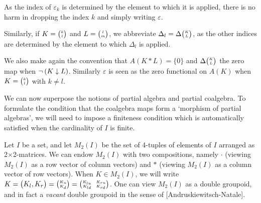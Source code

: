 \begin{Not}\label{NotCom} As the index of $\varepsilon_k$ is determined by the element to which it is applied, there is no harm in dropping the index $k$ and simply writing $\varepsilon$.

Similarly, if $K = {\tiny {\begin{pmatrix} k\\l\end{pmatrix}}}$ and $L = {\tiny {\begin{pmatrix} l\\m\end{pmatrix}}}$, we abbreviate $\Delta_l = \Delta{\tiny {\begin{pmatrix} K\\L\end{pmatrix}}}$, as the other indices are determined by the element to which $\Delta_l$ is applied.
\end{Not}

We also make again the convention that $A(K*L)=\{0\}$ and $\Delta{\tiny {\begin{pmatrix} K\\L\end{pmatrix}}}$ the zero map when $\neg\left(K\downarrow L\right)$. Similarly $\varepsilon$ is seen as the zero functional on $A(K)$ when $K={\tiny {\begin{pmatrix} k\\l\end{pmatrix}}}$ with $k\neq l$. 


We can now superpose the notions of partial algebra and partial coalgebra. To formulate the condition that the coalgebra maps form a `morphism of partial algebras', we will need to impose a finiteness condition which is automatically satisfied when the cardinality of $I$ is finite.

Let $I$ be a set, and let $M_2(I)$ be the set of 4-tuples of elements of $I$ arranged as 2$\times$2-matrices. We can endow $M_2(I)$ with two compositions, namely $\cdot$ (viewing $M_2(I)$ as a row vector of column vectors) and $*$ (viewing $M_2(I)$ as a column vector of row vectors). When $K\in M_2(I)$, we will write $K = {\begin{pmatrix} K_l, K_r\end{pmatrix}} = {\tiny {\begin{pmatrix} K_u\\K_d\end{pmatrix}}} = {{\tiny \begin{pmatrix} K_{lu} \quad K_{ru} \\ K_{ld} \quad K_{rd}\end{pmatrix}}}$. One can view $M_2(I)$ as a double groupoid, and in fact a \emph{vacant} double groupoid in the sense of [Andruskiewitsch-Natale]. %

